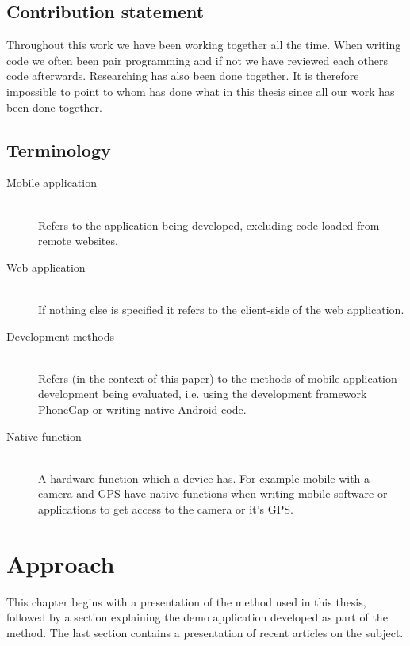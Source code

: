 \documentclass{./tex/cslthse-msc}
\begin{document}
\section{Contribution statement}
Throughout this work we have been working together all the time. When writing code we often been pair programming and if not we have reviewed each others code afterwards. Researching has also been done together. It is therefore impossible to point to whom has done what in this thesis since all our work has been done together. 


\section{Terminology}
\begin{description}
  \item[Mobile application] \hfill \\
    Refers to the application being developed, excluding code loaded from remote        websites.
  \item[Web application] \hfill \\
    If nothing else is specified it refers to the client-side of the web application.
  \item[Development methods] \hfill \\
    Refers (in the context of this paper) to the methods of mobile application          development being evaluated, i.e. using the development framework PhoneGap or       writing native Android code.
  \item[Native function] \hfill \\
     A hardware function which a device has. For example mobile with a camera and GPS have native functions when writing mobile software or applications to get access to the camera or it's GPS.
\end{description}


\chapter{Approach}
This chapter begins with a presentation of the method used in this thesis, followed by a section explaining the demo application developed as part of the method. The last section contains a presentation of recent articles on the subject. 
\end{document}
